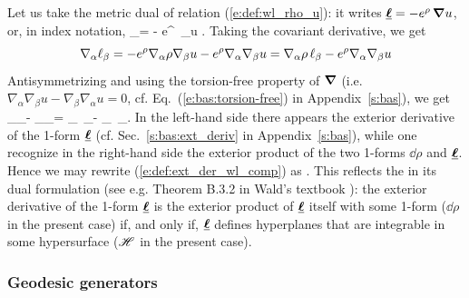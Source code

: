 Let us take the metric dual of relation (\ref{e:def:wl_rho_u}): it writes
$\underline{\bm{\ell}} = - e^\rho \, \bm{\nabla} u$, or, in index notation,
\be
    \el_\alpha = - e^\rho \, \nabla_\alpha u .
\ee
Taking the covariant derivative, we get
\[
    \nabla_\alpha \ell_\beta = - e^\rho \nabla_\alpha \rho \nabla_\beta u
                -   e^\rho  \nabla_\alpha \nabla_\beta u
                 = \nabla_\alpha \rho \, \ell_\beta - e^\rho  \nabla_\alpha \nabla_\beta u
\]
Antisymmetrizing and using the torsion-free property of $\bm{\nabla}$ (i.e.
$\nabla_\alpha \nabla_\beta u - \nabla_\beta \nabla_\alpha u = 0$, cf.
Eq.~(\ref{e:bas:torsion-free}) in Appendix~\ref{s:bas}), we get
\be \label{e:def:ext_der_wl_comp}
  \nabla_\alpha \el_\beta - \nabla_\beta \el_\alpha =
  \nabla_\alpha \rho \, \el_\beta -  \nabla_\beta \rho \, \el_\alpha  .
\ee
In the left-hand side there appears the exterior derivative of
the 1-form $\underline{\bm{\ell}}$ (cf. Sec.~\ref{s:bas:ext_deriv} in Appendix~\ref{s:bas}),
while one recognize in the right-hand side the exterior product of
the two 1-forms $\dd\rho$ and $\underline{\bm{\ell}}$. Hence we may rewrite (\ref{e:def:ext_der_wl_comp})
as
\be
    \encadre{ \dd \uu{\el} = \dd\rho \wedge \uu{\el} } .
\ee
This reflects the 
in its dual formulation (see e.g.
Theorem B.3.2 in Wald's textbook \cite{Wald84}): the exterior derivative of
the 1-form $\underline{\bm{\ell}}$ is the exterior product of $\underline{\bm{\ell}}$ itself with some
1-form ($\dd\rho$ in the present case) if, and only if,
$\underline{\bm{\ell}}$ defines hyperplanes that are integrable in some hypersurface ($\mathscr{H}$ in the present case).

\subsubsection{Geodesic generators}

